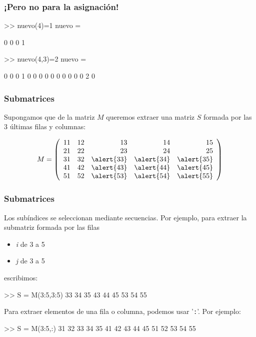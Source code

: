 \hypertarget{pero-no-para-la-asignaci-n}{}
\begin{frame}[containsverbatim]
\frametitle{¡Pero no para la asignación!}

\begin{Octave}
  >> nuevo(4)=1 
  nuevo = 
 
     0   0   0   1 
 
  >> nuevo(4,3)=2 
  nuevo = 
 
     0   0   0   1 
     0   0   0   0 
     0   0   0   0 
     0   0   2   0
\end{Octave}


\end{frame}


\hypertarget{submatrices}{}
\begin{frame}\frametitle{Submatrices}

Supongamos que de la matriz $M$ queremos extraer una
matriz $S$ formada por las 3 últimas filas y columnas:

$$
M=\left(\begin{array}{rrrrr}
  11 & 12 & 13 & 14 & 15 \\
  21 & 22 & 23 & 24 & 25 \\
  31 & 32 & \alert{33} & \alert{34} & \alert{35} \\
  41 & 42 & \alert{43} & \alert{44} & \alert{45} \\
  51 & 52 & \alert{53} & \alert{54} & \alert{55}
\end{array}\right)
$$
\end{frame}


\begin{frame}[containsverbatim]
\frametitle{Submatrices}

Los subíndices se seleccionan mediante secuencias.  Por ejemplo, para
extraer la submatriz formada por las filas
\begin{itemize}
\item \emph{i} de 3 a 5
\item \emph{j} de 3 a 5
\end{itemize}
escribimos:
\vspace{-0.6em}
\begin{Octave}
>> S = M(3:5,3:5) 
 33   34   35 
 43   44   45 
 53   54   55
\end{Octave}

\medskip
Para extraer elementos de una fila o columna, podemos usar
'\verb|:|'. Por ejemplo:
\vspace{-0.5em}
\begin{Octave}
>> S = M(3:5,:) 
 31   32   33   34   35 
 41   42   43   44   45 
 51   52   53   54   55
\end{Octave}


\end{frame}

